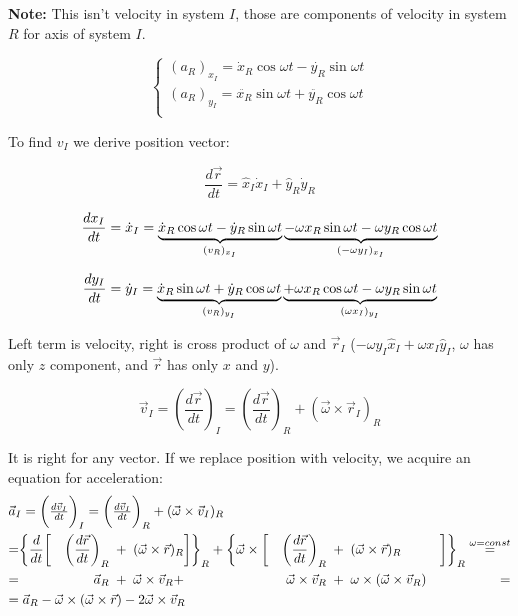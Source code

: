 \textbf{Note:} This isn't velocity in system $I$, those are components of velocity in system $R$ for axis of system $I$.


$$\begin{cases*}
(a_R)_{x_I} =  \dot{x}_R \cos \omega t - \dot{y_R} \sin \omega t \\
(a_R)_{y_I} =  \ddot{x_R} \sin \omega t + \ddot{y_R} \cos \omega t \\
\end{cases*}$$

To find $v_I$ we derive position vector:

$$\frac{d\vec{r}}{dt} = \hat{x}_I\dot{x}_I + \hat{y}_R\dot{y}_R$$

$$\frac{dx_I}{dt} = \dot{x}_I = \underbrace{\dot{x}_R \cos \omega t - \dot{y}_R \sin \omega t}_{\parbox{1.5cm}{\scriptsize  \centering  $(v_R)_{x_I}$  } } \underbrace{ - \omega x_R \sin \omega t  - \omega y_R \cos \omega t}_{\parbox{1.5cm}{\scriptsize  \centering  $(-\omega y_I)_{x_I}$} }$$

$$\frac{dy_I}{dt} = \dot{y}_I =  \underbrace{\dot{x}_R \sin \omega t  + \dot{y}_R \cos \omega t}_{\parbox{1.5cm}{\scriptsize  \centering  $(v_R)_{y_I}$ } } \underbrace{  + \omega x_R \cos \omega t- \omega y_R \sin \omega t}_{\parbox{1.5cm}{\scriptsize  \centering   $(\omega x_I)_{y_I}$} }  $$

Left term is velocity, right is cross product of $\omega$ and $\vec{r}_I$ ($- \omega y_I \hat{x}_I + \omega x_I \hat{y}_I$, $\omega$ has only $z$ component, and $\vec{r}$ has only $x$ and $y$).

$$\vec{v}_I = \left(\frac{d\vec{r}}{dt}\right)_I =  \left(\frac{d\vec{r}}{dt}\right)_R + (\vec{\omega} \times \vec{r}_I)_R$$

It is right for any vector. If we replace position with velocity, we acquire an equation for acceleration: 
\begin{align*}
\omit\rlap{$\vec{a}_I = \bigg(\frac{d\vec{v}_I}{dt}\bigg)_I =  \bigg(\frac{d\vec{v}_I}{dt}\bigg)_R + (\vec{\omega} \times \vec{v}_I)_R$} \\
=& \bigg\{ \frac{d}{dt}\bigg[ &\bigg( \frac{d\vec{r}}{dt} \bigg)_R \enspace +\enspace& ( \vec{\omega} \times \vec{r} )_R \bigg] \bigg\}_R + \bigg\{ \vec{\omega} \times \bigg[ &\bigg(\frac{d\vec{r}}{dt}\bigg)_R \enspace +\enspace &( \vec{\omega} \times \vec{r})_R & \bigg] \bigg\}_R \stackrel{\omega = const}{=} \\
= &  &\vec{a}_R \enspace +\enspace& \vec{\omega} \times \vec{v}_R + &  \vec{\omega} \times \vec{v}_R \enspace +\enspace& \omega \times ( \vec{\omega} \times \vec{v}_R )& = \\
\omit\rlap{$=  \vec{a}_R - \vec{\omega} \times ( \vec{\omega} \times \vec{r} ) - 2 \vec{\omega} \times \vec{v}_R$}
\end{align*}


